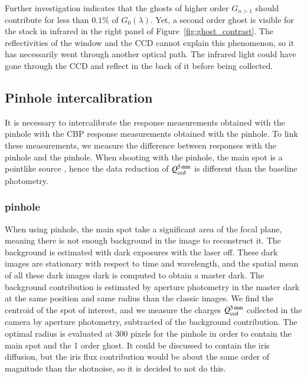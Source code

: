 Further investigation indicates that the ghosts of higher order $G_{n>1}$ should contribute for less than $0.1\%$ of $G_0(\lambda)$. Yet, a second order ghost is visible for the stack in infrared in the right panel of Figure~\ref{fig:ghost_contrast}. The reflectivities of the window and the CCD cannot explain this phenomenon, so it has necessarily went through another optical path. The infrared light could have gone through the CCD and reflect in the back of it before being collected.

\subsection{Pinhole intercalibration}

It is necessary to intercalibrate the \SD response measurements obtained with the \spinhole pinhole with the CBP response measurements obtained with the \bpinhole pinhole. To link these measurements, we measure the difference between \SD responses with the \spinhole pinhole and the \bpinhole pinhole. When shooting with the \bpinhole pinhole, the main spot is a pointlike source , hence the data reduction of $Q_{\mathrm{ccd}}^{\SI{5}{\milli\meter}}$ is different than the baseline photometry.

\subsubsection{\bpinhole pinhole}
\label{sec:photometry_big}

When using \bpinhole pinhole, the main spot take a significant area of the focal plane, meaning there is not enough background in the image to reconstruct it. The background is estimated with dark exposures with the laser off. These dark images are stationary with respect to time and wavelength, and the spatial mean of all these dark images dark is computed to obtain a master dark. The background contribution is estimated by aperture photometry in the master dark at the same position and same radius than the classic images. We find the centroid of the spot of interest, and we measure the charges $Q_{\mathrm{ccd}}^{\SI{5}{\milli\meter}}$ collected in the \SD camera by aperture photometry, subtracted of the background contribution. The optimal radius is evaluated at 300 pixels for the \bpinhole pinhole in order to contain the main spot and the 1 order ghost. It could be discussed to contain the iris diffusion, but the iris flux contribution would be about the same order of magnitude than the shotnoise, so it is decided to not do this.

